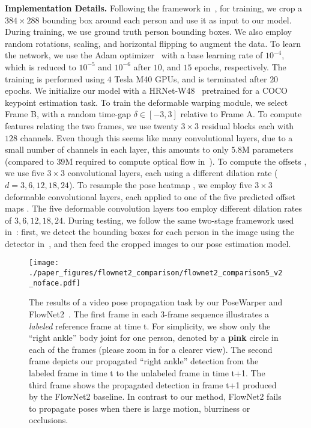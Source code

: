 \documentclass{article}
\begin{document}
\textbf{Implementation Details.} Following the framework in~\cite{sun2019deep}, for training, we crop a $384 \times 288$ bounding box around each person and use it as input to our model. During training, we use ground truth person bounding boxes. We also employ random rotations, scaling, and horizontal flipping to augment the data. To learn the network, we use the Adam optimizer~\cite{DBLP:journals/corr/KingmaB14} with a base learning rate of $10^{-4}$, which is reduced to $10^{-5}$ and $10^{-6}$ after $10$, and $15$ epochs, respectively. The training is performed using $4$ Tesla M40 GPUs, and is terminated after $20$ epochs. We initialize our model with a HRNet-W48~\cite{sun2019deep} pretrained for a COCO keypoint estimation task. To train the deformable warping module, we select Frame B, with a random time-gap $\delta \in [-3,3]$ relative to Frame A. To compute features relating the two frames, we use twenty $3 \times 3$ residual blocks each with $128$ channels. Even though this seems like many convolutional layers, due to a small number of channels in each layer, this amounts to only $5.8$M parameters (compared to $39$M required to compute optical flow in~\cite{DBLP:journals/corr/IlgMSKDB16}). To compute the offsets , we use five $3 \times 3$ convolutional layers, each using a different dilation rate ($d=3,6,12,18,24$). To resample the pose heatmap , we employ five $3 \times 3$ deformable convolutional layers, each applied to one of the five predicted offset maps . The five deformable convolution layers too employ different dilation rates of $3,6,12,18,24$. During testing, we follow the same two-stage framework used in~\cite{sun2019deep,xiao2018simple}: first, we detect the bounding boxes for each person in the image using the detector in~\cite{girdhar2018detecttrack}, and then feed the cropped images to our pose estimation model. 



\begin{figure}
\begin{center}
   \texttt{[image: ./paper\_figures/flownet2\_comparison/flownet2\_comparison5\_v2\_noface.pdf]}
\end{center}
\vspace{-0.1cm}
   \caption{The results of a video pose propagation task by our PoseWarper and FlowNet2~\cite{DBLP:journals/corr/IlgMSKDB16}. The first frame in each $3$-frame sequence illustrates a {\em labeled} reference frame at time t. For simplicity, we show only the ``right ankle'' body joint for one person, denoted by a \textbf{{\color{RubineRed} pink}} circle in each of the frames (please zoom in for a clearer view). The second frame depicts our propagated ``right ankle'' detection from the labeled frame in time t to the unlabeled frame in time t+1. The third frame shows the propagated detection in frame t+1 produced by the FlowNet2 baseline. In contrast to our method, FlowNet2 fails to propagate poses when there is large motion, blurriness or occlusions.\vspace{-0.3cm}}
\label{flownet2_comparison_fig}
\end{figure}
\end{document}
